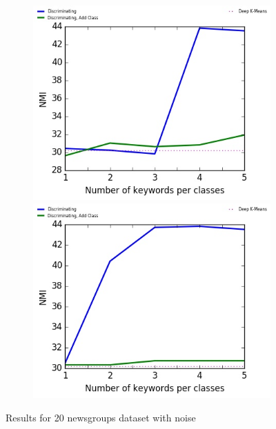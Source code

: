 \begin{figure}[!h]
\begin{subfigure}[b]{\textwidth}
\begin{minipage}{0.5\linewidth}
  \includegraphics[scale=0.49]{parts/res/dat_file/nmi/20NEWS_noisy.jpg}     
\end{minipage}
  \begin{minipage}{0.5\linewidth}
\centering
   \includegraphics[scale=0.49]{parts/res/dat_file/nmi/20NEWS_noisy_simple.jpg}     
\end{minipage}
\end{subfigure}\caption{\label{fig:20news_noise}Results for 20 newsgroups dataset with noise}
\end{figure}

